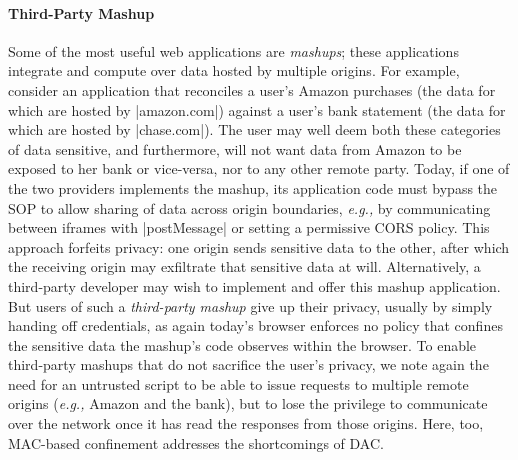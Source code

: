 
\paragraph{Third-Party Mashup}
Some of the most useful web applications are {\em mashups}; these
applications integrate and compute over data hosted by multiple
origins. For
example, consider an application that reconciles a user's Amazon
purchases (the data for which are hosted by \js|amazon.com|) against a
user's bank statement (the data for which are hosted by
\js|chase.com|). The user may well deem both these categories of data
sensitive, and furthermore, will not want data from Amazon to be
exposed to her bank or vice-versa, nor to any other remote
party. Today, if one of the two providers implements the mashup, its
application code must bypass the SOP to allow sharing of data across
origin boundaries, \emph{e.g.,} by communicating between iframes with
\js|postMessage| or setting a permissive CORS policy.
This approach forfeits privacy: one
origin sends sensitive data to the other, after which the receiving
origin may exfiltrate that sensitive data at will. Alternatively, a
third-party developer may wish to implement and offer this mashup
application. But users of such a {\em third-party mashup} give up
their privacy, usually by simply handing off credentials, as again today's browser enforces no policy that
confines the sensitive data the mashup's code observes within the
browser. To enable third-party mashups that do not sacrifice the
user's privacy, we note again the need for an untrusted script to be
able to issue requests to multiple remote origins (\emph{e.g.,} Amazon and
the bank), but to lose the privilege to communicate over the network
once it has read the responses from those origins. Here, too, MAC-based confinement
  addresses the shortcomings of DAC. 

